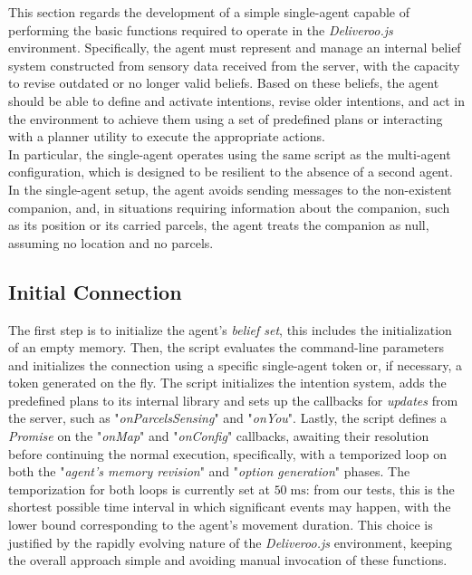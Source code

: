     This section regards the development of a simple single-agent capable of performing the basic functions required to operate in the \textit{Deliveroo.js} environment. Specifically, the agent must represent and manage an internal belief system constructed from sensory data received from the server, with the capacity to revise outdated or no longer valid beliefs. Based on these beliefs, the agent should be able to define and activate intentions, revise older intentions, and act in the environment to achieve them using a set of predefined plans or interacting with a planner utility to execute the appropriate actions.
    \medskip\\    
    In particular, the single-agent operates using the same script as the multi-agent configuration, which is designed to be resilient to the absence of a second agent. In the single-agent setup, the agent avoids sending messages to the non-existent companion, and, in situations requiring information about the companion, such as its position or its carried parcels, the agent treats the companion as null, assuming no location and no parcels.

    \subsection{Initial Connection}
        The first step is to initialize the agent's \textit{belief set}, this includes the initialization of an empty memory. Then, the script evaluates the command-line parameters and initializes the connection using a specific single-agent token or, if necessary, a token generated on the fly. The script initializes the intention system, adds the predefined plans to its internal library and sets up the callbacks for \textit{updates} from the server, such as "\textit{onParcelsSensing}" and "\textit{onYou}". Lastly, the script defines a \textit{Promise} on the "\textit{onMap}" and "\textit{onConfig}" callbacks, awaiting their resolution before continuing the normal execution, specifically, with a temporized loop on both the "\textit{agent's memory revision}" and "\textit{option generation}" phases. The temporization for both loops is currently set at $50\;\text{ms}$: from our tests, this is the shortest possible time interval in which significant events may happen, with the lower bound corresponding to the agent's movement duration. This choice is justified by the rapidly evolving nature of the \textit{Deliveroo.js} environment, keeping the overall approach simple and avoiding manual invocation of these functions.

